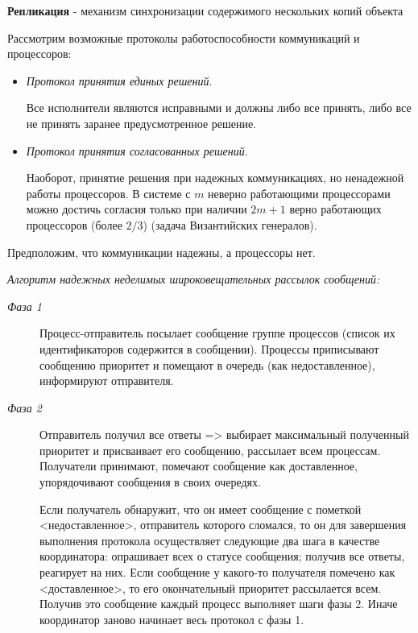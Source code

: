 \textbf{Репликация} - механизм синхронизации содержимого нескольких копий объекта

Рассмотрим возможные протоколы работоспособности коммуникаций и процессоров:

\begin{itemize}
    \item \textit{Протокол принятия единых решений}.

    Все исполнители являются исправными и должны либо все принять, либо все не принять заранее предусмотренное решение.

    \item \textit{Протокол принятия согласованных решений}.

    Наоборот, принятие решения при надежных коммуникациях, но ненадежной работы процессоров.
    В системе с $m$ неверно работающими процессорами можно достичь согласия только при наличии $2m+1$ верно работающих процессоров (более $2/3$) (задача Византийских генералов).
\end{itemize}

Предположим, что коммуникации надежны, а процессоры нет.

\textit{Алгоритм надежных неделимых широковещательных рассылок сообщений:}
\begin{description}
    \item[\textit{Фаза 1}] Процесс-отправитель посылает сообщение группе процессов (список их идентификаторов содержится в сообщении).
    Процессы приписывают сообщению приоритет и помещают в очередь (как недоставленное), информируют отправителя.
    \item[\textit{Фаза 2}] Отправитель получил все ответы => выбирает максимальный полученный приоритет и присваивает его сообщению, рассылает всем процессам.
    Получатели принимают, помечают сообщение как доставленное, упорядочивают сообщения в своих очередях.
    \item[] Если получатель обнаружит, что он имеет сообщение с пометкой <недоставленное>, отправитель которого сломался, то он для завершения выполнения протокола осуществляет следующие два шага в качестве координатора: опрашивает всех о статусе сообщения; получив все ответы, реагирует на них.
    Если сообщение у какого-то получателя помечено как <доставленное>, то его окончательный приоритет рассылается всем.
    Получив это сообщение каждый процесс выполняет шаги фазы 2.
    Иначе координатор заново начинает весь протокол с фазы 1.
\end{description}


